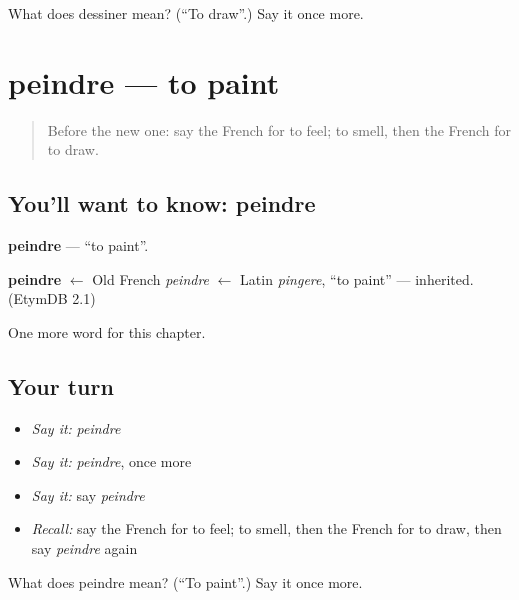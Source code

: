 \begin{tcolorbox}[breakable,colback=teal!4,colframe=teal!35!black,title={Before you move on}]
What does dessiner mean? (\textquotedblleft{}To draw\textquotedblright{}.) Say it once more.
\end{tcolorbox}
\section[peindre]{peindre — to paint}

\label{lesson:FR-C66-peindre}



\begin{quote}
Before the new one: say the French for to feel; to smell, then the French for to draw.
\end{quote}

\subsection*{You'll want to know: peindre}
\textbf{peindre} — \textquotedblleft{}to paint\textquotedblright{}.

\begin{cousinweb}
\textbf{peindre} $\leftarrow$ Old French \emph{peindre} $\leftarrow$ Latin \emph{pingere}, \textquotedblleft{}to paint\textquotedblright{} — inherited. (EtymDB 2.1)
\end{cousinweb}

\begin{grammarlens}[title={What you've built}]
One more word for this chapter.
\end{grammarlens}

\subsection*{Your turn}
\begin{itemize}
\raggedright
  \item \emph{Say it:} \emph{peindre}
  \item \emph{Say it:} \emph{peindre}, once more
  \item \emph{Say it:} say \emph{peindre}
  \item \emph{Recall:} say the French for to feel; to smell, then the French for to draw, then say \emph{peindre} again
\end{itemize}

\begin{tcolorbox}[breakable,colback=teal!4,colframe=teal!35!black,title={Before you move on}]
What does peindre mean? (\textquotedblleft{}To paint\textquotedblright{}.) Say it once more.
\end{tcolorbox}
